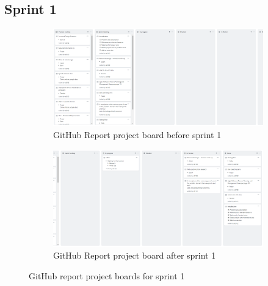 \documentclass[11pt]{report}
\begin{document}
\subsection{Sprint 1}

\begin{figure}[!h]
\centering
\begin{subfigure}{\textwidth}
	\centering	
	\includegraphics[width=1\linewidth]{git-report-1-before.png}
	\caption{GitHub Report project board before sprint 1}
	\label{fig:agileapp-rb1}
\end{subfigure}
\begin{subfigure}{\textwidth}
	\centering	
	\includegraphics[width=1\linewidth]{git-report-1-after.png}
	\caption{GitHub Report project board after sprint 1}
	\label{fig:agileapp-ra1}
\end{subfigure}

\caption{GitHub report project boards for sprint 1}

\end{figure}

\newpage
\end{document}

